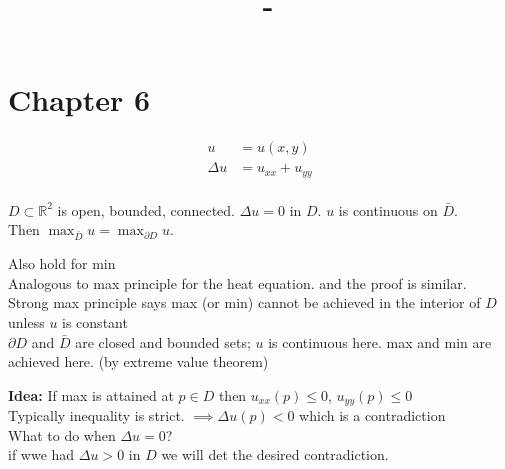 \documentclass[answers,12pt,addpoints]{exam}
\author{\name}
\title{\course \ - \assignment}
\begin{document}
\maketitle
\section*{Chapter 6}
\begin{align*}
    u &= u(x,y)\\
    \Delta u &= u_{xx} + u_{yy}\\
\end{align*}
\begin{definition}
    $D \subset \mathbb{R}^2$ is open, bounded, connected. $\Delta u = 0$ in $D$. $u$ is continuous on $\bar{D}$.\\
    Then $\max_{\bar{D}} u = \max_{\partial D} u$.
\end{definition}
\begin{remark}
    Also hold for min \\
    Analogous to max principle for the heat equation. and the proof is similar.\\
    Strong max principle says max (or min) cannot be achieved in the interior of $D$ unless $u$ is constant\\
    $\partial D$ and $\bar{D}$ are closed and bounded sets; $u$ is continuous here. max and min are achieved here. (by extreme value theorem)\\
\end{remark}
\textbf{Idea:} If max is attained at $p \in D$ then $u_{xx}(p) \leq 0$, $u_{yy}(p) \leq 0$\\
Typically inequality is strict. $\implies \Delta u(p) < 0$ which is a contradiction \\
What to do when $\Delta u = 0$?\\ 
if wwe had $\Delta u > 0$ in $D$ we will det the desired contradiction.\\
\end{document}
